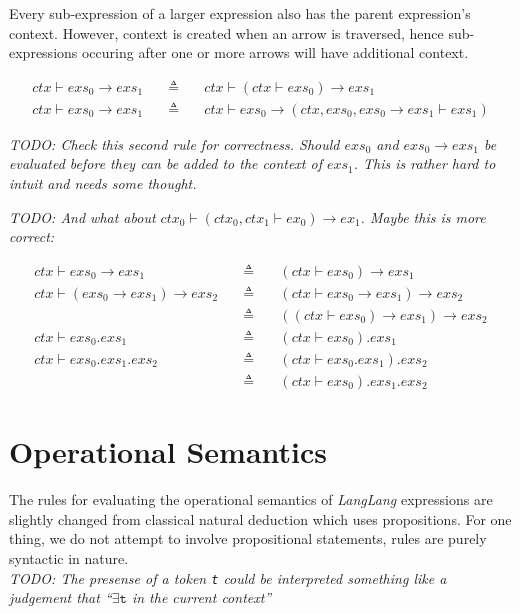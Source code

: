 \documentclass[a4paper,11pt]{article}
\begin{document}
Every sub-expression of a larger expression also has the parent expression's context.
However, context is created when an arrow is traversed, hence sub-expressions occuring after one or more arrows will have additional context.

\begin{eqnarray*}
ctx \vdash exs_0 \rightarrow exs_1 \quad&\triangleq&\quad ctx \vdash (ctx \vdash exs_0) \rightarrow exs_1 \\
ctx \vdash exs_0 \rightarrow exs_1 \quad&\triangleq&\quad ctx \vdash exs_0 \rightarrow (ctx,exs_0,exs_0 \rightarrow exs_1 \vdash exs_1)
\end{eqnarray*}

\emph{TODO: Check this second rule for correctness. 
Should $exs_0$ and $exs_0 \rightarrow exs_1$ be evaluated before they can be added to the context of $exs_1$.
This is rather hard to intuit and needs some thought.}

\emph{TODO: And what about $ctx_0 \vdash (ctx_0,ctx_1 \vdash ex_0) \rightarrow ex_1$. Maybe this is more correct:}

\begin{eqnarray*}
ctx \vdash exs_0 \rightarrow exs_1 \quad&\triangleq&\quad (ctx \vdash exs_0) \rightarrow exs_1 \\
ctx \vdash (exs_0 \rightarrow exs_1) \rightarrow exs_2 \quad&\triangleq&\quad (ctx \vdash exs_0 \rightarrow exs_1) \rightarrow exs_2 \\
                                                            &\triangleq&\quad ((ctx \vdash exs_0) \rightarrow exs_1) \rightarrow exs_2 \\
ctx \vdash exs_0.exs_1 \quad&\triangleq&\quad (ctx \vdash exs_0).exs_1 \\
ctx \vdash exs_0.exs_1.exs_2 \quad&\triangleq&\quad (ctx \vdash exs_0.exs_1).exs_2 \\
                                  &\triangleq&\quad (ctx \vdash exs_0).exs_1.exs_2
\end{eqnarray*}

\section{Operational Semantics}
The rules for evaluating the operational semantics of \textsl{LangLang} expressions are slightly changed from classical natural deduction which uses propositions.
For one thing, we do not attempt to involve propositional statements, rules are purely syntactic in nature.\\
\emph{TODO: The presense of a token \texttt{t} could be interpreted something like a judgement that ``$\exists\mathtt{t}$ in the current context''}\\
\end{document}
